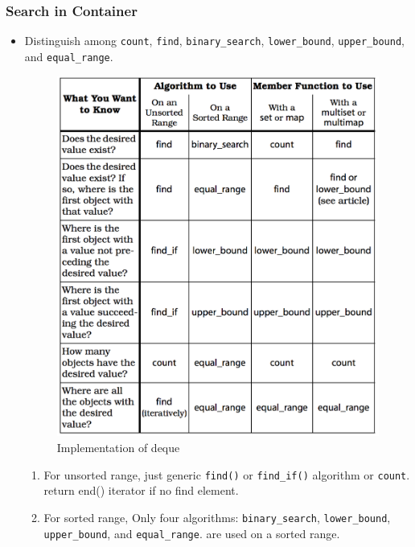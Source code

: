 \documentclass[a4paper,11pt,twoside]{book}
\begin{document}
\subsubsection{Search in Container}
\begin{itemize}
	\item Distinguish among \texttt{count}, \texttt{find}, \texttt{binary\_search}, \texttt{lower\_bound}, \texttt{upper\_bound}, and \texttt{equal\_range}.

\begin{figure}[ht]
	\centering
	\includegraphics[scale=0.6]{pics/distinguish.png}
	\caption{Implementation of deque}
	\label{fig:queue}
\end{figure}



	\begin{enumerate}
	\item For unsorted range, just generic \texttt{find()} or \texttt{find\_if()} algorithm or \texttt{count}. return end() iterator if no find element.
	
	\item For sorted range, Only four algorithms: \texttt{binary\_search}, \texttt{lower\_bound}, \texttt{upper\_bound}, and \texttt{equal\_range}. are used on a sorted range.
	

\end{enumerate}
\end{itemize}
\end{document}
